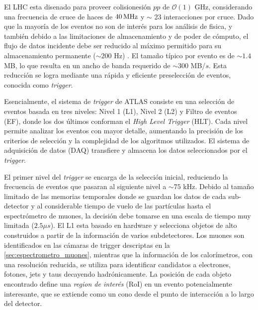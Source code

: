 El LHC esta disenado para proveer colisionesión $pp$
de $\mathcal{O}(1)$ GHz, considerando una frecuencia de cruce de haces
de $\unit[40]{MHz}$ y $\sim$ 23 interacciones por cruce.
Dado que la mayoría de
los eventos no son de interés para los análisis de fisica,
y también debido a las limitaciones de almacenamiento y de
poder de cómputo, el flujo de datos incidente debe ser reducido al máximo
permitido para su almacenamiento permanente ($\sim 200$ Hz) \cite{Aad:2012xs}. El tamaño típico
por evento es de $\sim 1.4$ MB, lo que resulta en un ancho de banda requerido de
$\sim 300$ MB/$s$. Esta reducción se logra mediante una rápida y eficiente
preselección de eventos, conocida como \emph{trigger}.

Esencialmente, el sistema de \emph{trigger} de ATLAS \cite{trigger} consiste en una selección
de eventos basada en tres niveles:
Nivel 1 (L1), Nivel 2 (L2) y Filtro de eventos (EF), donde
los dos últimos conforman el \emph{High Level Trigger} (HLT). Cada nivel permite
analizar los eventos con mayor detalle, aumentando la precisión de los criterios
de selección y la complejidad de los algoritmos utilizados. El sistema de
adquisición de datos (DAQ) transfiere y almacena los datos seleccionados por el
\emph{trigger}.

El primer nivel del \emph{trigger} se encarga de la selección inicial, reduciendo la
frecuencia de eventos que pasaran al siguiente nivel a $\sim 75$ kHz. Debido al
tamaño limitado de las memorias temporales donde se guardan los datos
de cada sub-detector y al considerable tiempo de vuelo de las partículas hasta el
espectrómetro de muones, la decisión debe tomarse en una escala de tiempo muy
limitada ($2.5 \mu s$). El L1 esta basado en hardware y selecciona objetos
de alto {\pt} construidos a partir de la información de varios subdetectores.
Los muones son identificados en las cámaras de trigger descriptas en la \cref{sec:espectrometro_muones},
mientras que la información de los calorímetros, con una resolución reducida, se
utiliza para identificar candidatos a electrones, fotones, jets y taus decayendo
hadrónicamente.
La posición de cada objeto encontrado define una \emph{region de
  interés} (RoI) en un evento potencialmente interesante, que se extiende como
un cono desde el punto de interacción a lo largo del detector.

